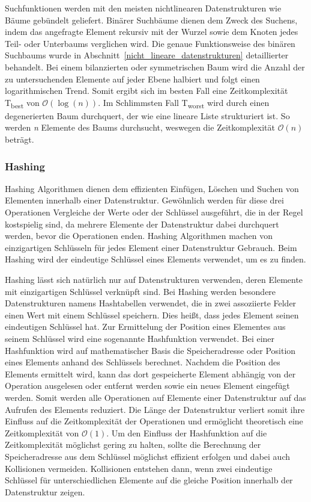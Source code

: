 Suchfunktionen werden mit den meisten nichtlinearen Datenstrukturen wie Bäume gebündelt geliefert. Binärer Suchbäume dienen dem Zweck des Suchens, indem das angefragte Element rekursiv mit der Wurzel sowie dem Knoten jedes Teil- oder Unterbaums verglichen wird. Die genaue Funktionsweise des binären Suchbaums wurde in Abschnitt~\ref{nicht_lineare_datenstrukturen} detaillierter behandelt. Bei einem bilanzierten oder symmetrischen Baum wird die Anzahl der zu untersuchenden Elemente auf jeder Ebene halbiert und folgt einen logarithmischen Trend. Somit ergibt sich im besten Fall eine Zeitkomplexität T\textsubscript{best} von $\mathcal{O}(\log(n))$. Im Schlimmsten Fall T\textsubscript{worst} wird durch einen degenerierten Baum durchquert, der wie eine lineare Liste strukturiert ist. So werden \textit{n} Elemente des Baums durchsucht, weswegen die Zeitkomplexität $\mathcal{O}(n)$ beträgt. \autocite[226-228]{hubwieser_fundamente_2015}

\subsubsection{Hashing}

Hashing Algorithmen dienen dem effizienten Einfügen, Löschen und Suchen von Elementen innerhalb einer Datenstruktur. Gewöhnlich werden für diese drei Operationen Vergleiche der Werte oder der Schlüssel ausgeführt, die in der Regel kostspielig sind, da mehrere Elemente der Datenstruktur dabei durchquert werden, bevor die Operationen enden. Hashing Algorithmen machen von einzigartigen Schlüsseln für jedes Element einer Datenstruktur Gebrauch. Beim Hashing wird der eindeutige Schlüssel eines Elements verwendet, um es zu finden. \autocite[229]{hubwieser_fundamente_2015}

Hashing lässt sich natürlich nur auf Datenstrukturen verwenden, deren Elemente mit einzigartigen Schlüssel verknüpft sind. Bei Hashing werden besondere Datenstrukturen namens Hashtabellen verwendet, die in zwei assoziierte Felder einen Wert mit einem Schlüssel speichern. Dies heißt, dass jedes Element seinen eindeutigen Schlüssel hat. Zur Ermittelung der Position eines Elementes aus seinem Schlüssel wird eine sogenannte Hashfunktion verwendet. Bei einer Hashfunktion wird auf mathematischer Basis die Speicheradresse oder Position eines Elements anhand des Schlüssels berechnet. Nachdem die Position des Elements ermittelt wird, kann das dort gespeicherte Element abhängig von der Operation ausgelesen oder entfernt werden sowie ein neues Element eingefügt werden. Somit werden alle Operationen auf Elemente einer Datenstruktur auf das Aufrufen des Elements reduziert. Die Länge der Datenstruktur verliert somit ihre Einfluss auf die Zeitkomplexität der Operationen und ermöglicht theoretisch eine Zeitkomplexität von $\mathcal{O}(1)$. Um den Einfluss der Hashfunktion auf die Zeitkomplexität möglichst gering zu halten, sollte die Berechnung der Speicheradresse aus dem Schlüssel möglichst effizient erfolgen und dabei auch Kollisionen vermeiden. Kollisionen entstehen dann, wenn zwei eindeutige Schlüssel für unterschiedlichen Elemente auf die gleiche Position innerhalb der Datenstruktur zeigen. \autocite[230-231]{hubwieser_fundamente_2015}

